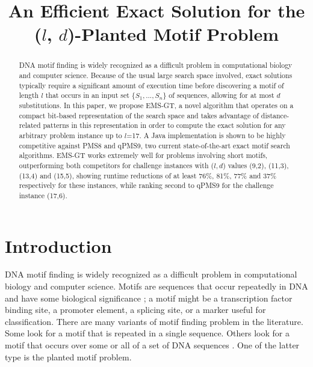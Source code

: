 \documentclass[conference]{IEEEtran}
\begin{document}
\title{An Efficient Exact Solution for the ($l$, $d$)-Planted Motif Problem}
\author{
  \and {}
  \and {}
	}
\maketitle

\begin{abstract}\boldmath
	DNA motif finding is widely recognized as a difficult problem in computational biology and computer science. Because of the usual large search space involved, exact solutions typically require a significant amount of execution time before discovering a motif of length $l$ that occurs in an input set $\{S_{1} ,...,S_{n}\}$ of sequences, allowing for at most $d$ substitutions. In this paper, we propose EMS-GT, a novel algorithm that operates on a compact bit-based representation of the search space and takes advantage of distance-related patterns in this representation in order to compute the exact solution for any arbitrary problem instance up to $l$=17. A Java implementation
	is shown to be highly competitive against PMS8 and qPMS9, two current state-of-the-art exact motif search algorithms. EMS-GT works extremely well for problems involving short motifs, outperforming both competitors for challenge instances with ($l,d$) values (9,2), (11,3), (13,4) and (15,5), showing runtime reductions of at least 76\%, 81\%, 77\% and 37\% respectively for these instances, while ranking second to qPMS9 for the challenge instance (17,6).\newline
\end{abstract}

\section{Introduction}
	DNA motif finding is widely recognized as a difficult problem in computational biology and computer science. Motifs are sequences that occur repeatedly in DNA and have some biological significance \cite{das2007survey}; a motif might be a transcription factor binding site, a promoter element, a splicing site, or a marker useful for classification. There are many variants of motif finding problem in the literature. Some look for a motif that is repeated in a single sequence. Others look for a motif that occurs over some or all of a set of DNA sequences \cite{dasari2010efficient}. One of the latter type is the planted motif problem.
\end{document}
